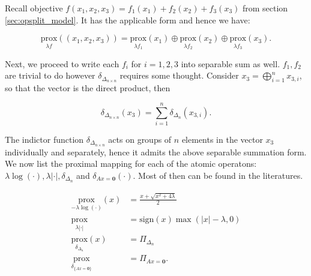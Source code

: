 \documentclass[11pt]{article}
\theoremstyle{definition}
\numberwithin{equation}{subsection}
\begin{document}
    \begin{linenumbers}
        Recall objective $f(x_1, x_2, x_3) = f_1(x_1) + f_2(x_2) + f_3(x_3)$ from section \ref*{sec:opsplit_model}. It has the applicable form and hence we have:     
    \end{linenumbers}
    \[
        \underset{\lambda f}{\text{prox}}((x_1, x_2, x_3))
        = 
        \underset{\lambda f_1}{\text{prox}}(x_1) \oplus
        \underset{\lambda f_2}{\text{prox}}(x_2) \oplus
        \underset{\lambda f_3}{\text{prox}}(x_3). 
    \]
    \begin{linenumbers}
        Next, we proceed to write each $f_i$ for $i = 1, 2, 3$ into separable sum as well. 
        $f_1, f_2$ are trivial to do however $\delta_{\Delta_{n\times n}}$ requires some thought. 
        Consider $x_3 = \bigoplus_{i = 1}^n x_{3, i}$, so that the vector is the direct product, then     
    \end{linenumbers}
    \[
        \delta_{\Delta_{n\times n}}(x_3) = 
        \sum_{i = 1}^{n} \delta_{\Delta_n}(x_{3, i}). 
    \]
    \begin{linenumbers}
        The indictor function $\delta_{\Delta_{n\times n}}$ acts on groups of $n$ elements in the vector $x_3$ individually and separately, hence it admits the above separable summation form. 
        We now list the proximal mapping for each of the atomic operatons: $\lambda\log(\cdot), \lambda|\cdot|, \delta_{\Delta_n}$ and $\delta_{Ax = \mathbf 0}(\cdot)$. 
        Most of then can be found in the literatures.     
    \end{linenumbers}
    \begin{align*}
        \underset{-\lambda \log(\cdot)}{\text{prox}}(x)
        &= 
        \frac{x + \sqrt{x^2 + 4\lambda}}{2}
        \\
        \underset{\lambda |\cdot|}{\text{prox}}
        &= 
        \text{sign}(x) \max(|x| - \lambda, 0)
        \\
        \underset{\delta_{\Delta_n}}{\text{prox}}(x)&= 
        \Pi_{\Delta_{n}}
        \\
        \underset{\delta_{\{Ax = \mathbf 0\}}}{\text{prox}} &= 
        \Pi_{Ax = \mathbf 0}. 
    \end{align*}
\end{document}
